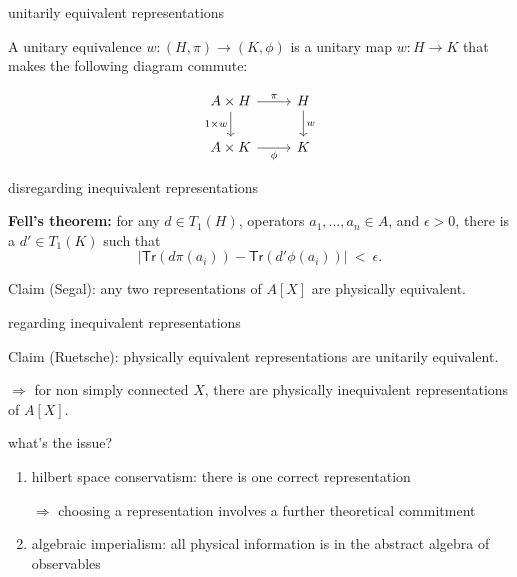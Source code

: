 \documentclass{beamer}
\begin{document}
\begin{frame}{unitarily equivalent representations}

  A unitary equivalence $w:(H,\pi )\to (K,\phi )$ is a unitary map
  $w:H\to K$ that makes the following diagram commute:

$$
\begin{tikzcd}[ampersand replacement=\&]
  A \times H \arrow{r}{\pi } \arrow{d}[left]{1\times w } \& H \arrow{d}[right]{w} \\
  A \times K \arrow{r}[below]{\phi } \& K
\end{tikzcd}
$$

\end{frame}


\begin{frame}{disregarding inequivalent representations}

  \textbf{Fell's theorem:} for any $d\in T_1(H)$, operators $a_1,\dots
  ,a_n\in A$, and $\epsilon >0$, there is a $d'\in T_1(K)$ such that
$$ \bigl| \mathsf{Tr}(d\pi(a_i))- \mathsf{Tr}(d'\phi (a_i)) \bigr| \: < \: \epsilon .$$

\bigskip Claim (Segal): any two representations of $A[X]$ are
physically equivalent.


\end{frame}


\begin{frame}{regarding inequivalent representations}

  Claim (Ruetsche): physically equivalent representations are
  unitarily equivalent.

  \bigskip $\Rightarrow$ for non simply connected $X$, there are
  physically inequivalent representations of $A[X]$.



\end{frame}






\begin{frame}{what's the issue?}

\begin{enumerate}
\item hilbert space conservatism: there is one correct representation

  {\small $\Rightarrow$ choosing a representation involves a
    further theoretical commitment}

\item algebraic imperialism: all physical information is in the
  abstract algebra of observables

\end{enumerate}

\end{frame}
\end{document}
